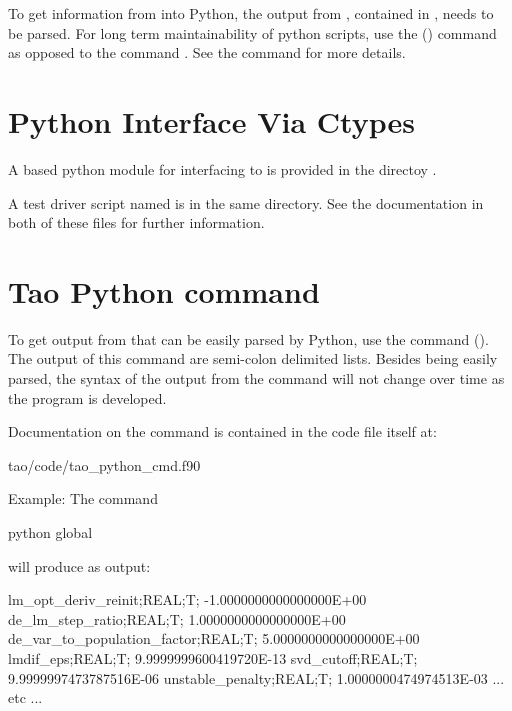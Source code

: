 To get information from \tao into Python, the output from \tao,
contained in , needs to be parsed. For long term
maintainability of python scripts, use the  () command 
as opposed to the  command . See the  command for more details.

\section{Python Interface Via Ctypes}

A  based python module  for interfacing \tao to  is provided in
the directoy .

A test driver script named  is in the same directory. See the documentation in both of
these files for further information.

\section{Tao Python command}

To get output from \tao that can be easily parsed by Python, use the  command
(). The output of this command are semi-colon delimited lists. Besides being easily
parsed, the syntax of the output from the  command will not change over time as the \tao
program is developed.

Documentation on the  command is contained in the code file itself at:
\begin{example}
  tao/code/tao_python_cmd.f90
\end{example}

Example: The command
\begin{example}
  python global
\end{example}
will produce as output:
\begin{example}
  lm_opt_deriv_reinit;REAL;T; -1.0000000000000000E+00
  de_lm_step_ratio;REAL;T;  1.0000000000000000E+00
  de_var_to_population_factor;REAL;T;  5.0000000000000000E+00
  lmdif_eps;REAL;T;  9.9999999600419720E-13
  svd_cutoff;REAL;T;  9.9999997473787516E-06
  unstable_penalty;REAL;T;  1.0000000474974513E-03
  ... etc ...
\end{example}


